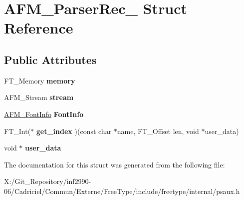 \hypertarget{struct_a_f_m___parser_rec__}{\section{A\-F\-M\-\_\-\-Parser\-Rec\-\_\- Struct Reference}
\label{struct_a_f_m___parser_rec__}
}
\subsection*{Public Attributes}
\begin{DoxyCompactItemize}
\item 
\hypertarget{struct_a_f_m___parser_rec___a3fec8b1760fa9261f48ee87dc2b3858b}{F\-T\-\_\-\-Memory {\bfseries memory}}\label{struct_a_f_m___parser_rec___a3fec8b1760fa9261f48ee87dc2b3858b}

\item 
\hypertarget{struct_a_f_m___parser_rec___adf3b1165216cbd1f7ec7ae736fd4270a}{A\-F\-M\-\_\-\-Stream {\bfseries stream}}\label{struct_a_f_m___parser_rec___adf3b1165216cbd1f7ec7ae736fd4270a}

\item 
\hypertarget{struct_a_f_m___parser_rec___ae53d6cddac32a0eb7014c3a9f74517df}{\hyperlink{struct_a_f_m___font_info_rec__}{A\-F\-M\-\_\-\-Font\-Info} {\bfseries Font\-Info}}\label{struct_a_f_m___parser_rec___ae53d6cddac32a0eb7014c3a9f74517df}

\item 
\hypertarget{struct_a_f_m___parser_rec___a5f93c5c83d0957c19d3827071d90926f}{F\-T\-\_\-\-Int($\ast$ {\bfseries get\-\_\-index} )(const char $\ast$name, F\-T\-\_\-\-Offset len, void $\ast$user\-\_\-data)}\label{struct_a_f_m___parser_rec___a5f93c5c83d0957c19d3827071d90926f}

\item 
\hypertarget{struct_a_f_m___parser_rec___a9fa78a781737bf27e00448c5092b7657}{void $\ast$ {\bfseries user\-\_\-data}}\label{struct_a_f_m___parser_rec___a9fa78a781737bf27e00448c5092b7657}

\end{DoxyCompactItemize}


The documentation for this struct was generated from the following file\-:\begin{DoxyCompactItemize}
\item 
X\-:/\-Git\-\_\-\-Repository/inf2990-\/06/\-Cadriciel/\-Commun/\-Externe/\-Free\-Type/include/freetype/internal/psaux.\-h\end{DoxyCompactItemize}
